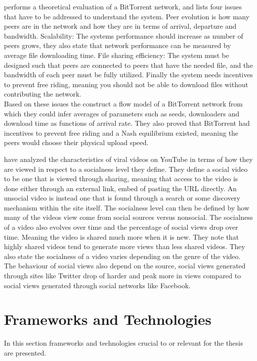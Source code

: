 \citeauthor{qiu2004modeling} \cite{qiu2004modeling} performs a theoretical evaluation of a BitTorrent network, and lists four issues that have to be addressed to understand the system.
Peer evolution is how many peers are in the network and how they are in terms of arrival, departure and bandwidth.
Scalability: The systems performance should increase as number of peers grows, they also state that network performance can be measured by average file downloading time.
File sharing efficiency: The system must be designed such that peers are connected to peers that have the needed file, and the bandwidth of each peer must be fully utilized.
Finally the system needs incentives to prevent free riding, meaning you should not be able to download files without contributing the network.\\
Based on these issues the construct a flow model of a BitTorrent network from which they could infer averages of parameters such as seeds, downloaders and download time as functions of arrival rate. They also proved that BitTorrent had incentives to prevent free riding and a Nash equilibrium existed, meaning the peers would choose their physical upload speed.

\citeauthor{broxton2013catching} \cite{broxton2013catching} have analyzed the characteristics of viral videos on YouTube in terms of how they are viewed in respect to a socialness level they define. They define a social video to be one that is viewed through sharing, meaning that access to the video is done either through an external link, embed of pasting the URL directly. An unsocial video is instead one that is found through a search or some discovery mechanism within the site itself. The socialness level can then be defined by how many of the videos view come from social sources versus nonsocial. The socialness of a video also evolves over time and the percentage of social views drop over time. Meaning the video is shared much more when it is new. They note that highly shared videos tend to generate more views than less shared videos. They also state the socialness of a video varies depending on the genre of the video. The behaviour of social views also depend on the source, social views generated through sites like Twitter drop of harder and peak more in views compared to social views generated through social networks like Facebook.


\section{Frameworks and Technologies}
\label{sec:fram-techn}
In this section frameworks and technologies crucial to or relevant for the thesis are presented.

